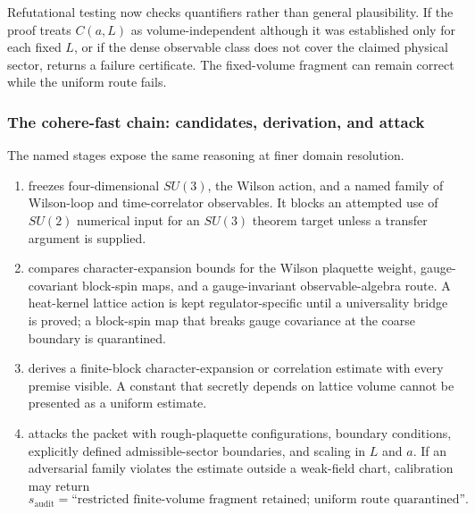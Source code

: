 Refutational testing now checks quantifiers rather than general plausibility.
If the proof treats $C(a,L)$ as volume-independent although it was established
only for each fixed $L$, or if the dense observable class does not cover the
claimed physical sector,  returns a failure
certificate. The fixed-volume fragment can remain correct while the uniform
route fails.

\subsubsection{The cohere-fast chain: candidates, derivation, and attack}

The named  stages expose the same reasoning at finer domain
resolution.

\begin{enumerate}[leftmargin=*,itemsep=0.4em]
\item {} freezes four-dimensional $SU(3)$,
  the Wilson action, and a named family of Wilson-loop and time-correlator
  observables. It blocks an attempted use of $SU(2)$ numerical input for an
  $SU(3)$ theorem target unless a transfer argument is supplied.

\item {} compares character-expansion bounds
  for the Wilson plaquette weight, gauge-covariant block-spin maps, and a
  gauge-invariant observable-algebra route. A heat-kernel lattice action is
  kept regulator-specific until a universality bridge is proved; a block-spin
  map that breaks gauge covariance at the coarse boundary is quarantined.

\item {} derives a finite-block
  character-expansion or correlation estimate with every premise visible. A
  constant that secretly depends on lattice volume cannot be presented as a
  uniform estimate.

\item {} attacks the packet with
  rough-plaquette configurations, boundary conditions, explicitly defined
  admissible-sector boundaries, and scaling in $L$ and $a$. If an adversarial
  family violates the estimate outside a weak-field chart, calibration may
  return
  \[
    s_{\mathrm{audit}}
    =\text{``restricted finite-volume fragment retained;
      uniform route quarantined''}.
  \]
\end{enumerate}

